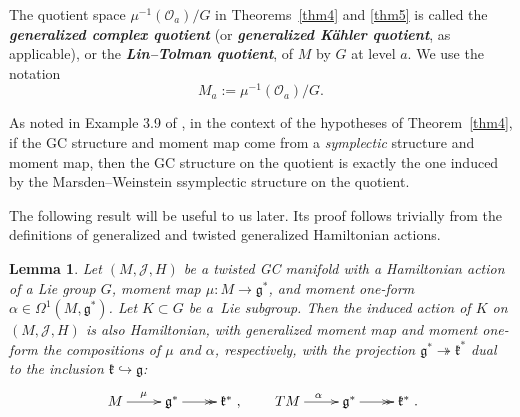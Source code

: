 \documentclass[11pt]{article}
\newtheorem{Lemma}[Theorem]{Lemma}
\numberwithin{equation}{section}
\newcommand{\deff}[1]{\textbf{\emph{#1}}}
\newcommand{\func}[3]{#1 \colon #2 \to #3}
\newcommand{\tang}{T}
\begin{document}
\begin{Definition}
The quotient space $\mu^{-1}(\mathcal{O}_a) / G$ in Theorems~\ref{thm4} and \ref{thm5} is called the \deff{gene\-ralized complex quotient} (or \deff{generalized K\"ahler quotient}, as applicable), or the \deff{Lin--Tolman quotient}, of $M$ by $G$ at level $a$.  We use the notation
\[
  M_a := \mu^{-1}(\mathcal{O}_a) / G.
\]
\end{Definition}


\begin{Remark}
As noted in Example 3.9 of \cite{lintolman}, in the context of the hypotheses of Theorem~\ref{thm4}, if the GC structure and moment map come from a \emph{symplectic} structure and moment map, then the GC structure on the quotient is exactly the one induced by the Marsden--Weinstein ssymplectic structure on the quotient.
\end{Remark}


The following result will be useful to us later.  Its proof follows trivially from the def\/initions of generalized and twisted generalized Hamiltonian actions.


\begin{Lemma} \label{lem6}
Let $(M,\mathcal{J},H)$ be a twisted GC manifold with a Hamiltonian action of a Lie group $G$, moment map $\func{\mu}{M}{\mathfrak{g}^*}$, and moment one-form $\alpha \in \Omega^1(M,\mathfrak{g}^*)$.
Let $K \subset G$ be a~Lie subgroup.
Then the induced action of $K$ on $(M,\mathcal{J},H)$ is also Hamiltonian, with generalized moment map and moment one-form the compositions of $\mu$ and $\alpha$, respectively, with the projection $\mathfrak{g}^* \twoheadrightarrow \mathfrak{k}^*$ dual to the inclusion $\mathfrak{k} \hookrightarrow \mathfrak{g}$:
  \[
    \xymatrix{
      M \ar[r]^{\mu} & \mathfrak{g}^* \ar@{>>}[r] & \mathfrak{k}^*
    },
    \qquad
    \xymatrix{
      \tang M \ar[r]^{\alpha}
      & \mathfrak{g}^* \ar@{>>}[r] & \mathfrak{k}^*
    }.
  \]
\end{Lemma}
\end{document}
